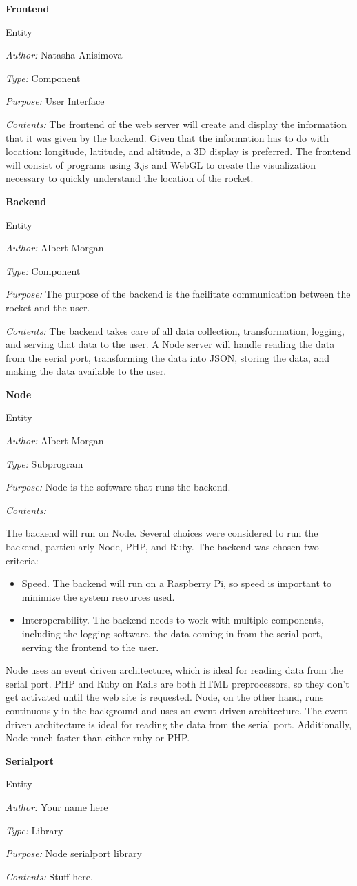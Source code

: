 \documentclass[10pt,draftclsnofoot,onecolumn]{IEEEtran}
\newcommand{\newentity}[5]{
	\begin{minipage}{\linewidth}
	\noindent\textbf{#2}
	
	\noindent Entity
	
	\noindent\textit{Author:} {#1}
		
	\noindent\textit{Type:} {#3}
	
	\noindent\textit{Purpose:} {#4}
	
	\noindent\textit{Contents:} {#5}
	\vspace{.5cm}
	\end{minipage}
}
\begin{document}
	\newentity
	{Natasha Anisimova}
	{Frontend}
	{Component}
	{User Interface}
	{
		The frontend of the web server will create and display the information that it was given by the backend. Given
		that the information has to do with location: longitude, latitude, and altitude, a 3D display is preferred. The
		frontend will consist of programs using 3.js and WebGL to create the visualization necessary to quickly understand the
		location of the rocket.
	}

	\newentity
	{Albert Morgan}
	{Backend}
	{Component}
	{
		The purpose of the backend is the facilitate communication between the rocket and the user.
	}
	{
		The backend takes care of all data collection, transformation, logging, and serving that data to the user.
		A Node server will handle reading the data from the serial port, transforming the data into JSON,
		storing the data, and making the data available to the user.
	}

	\newentity
	{Albert Morgan}
	{Node}
	{Subprogram}
	{Node is the software that runs the backend.}
	{
		The backend will run on Node. Several choices were considered to run the backend, particularly Node, PHP, and Ruby.
		The backend was chosen two criteria:
		\begin{itemize}
			\item Speed. The backend will run on a Raspberry Pi, so speed is important to minimize the system resources used.
			\item Interoperability. The backend needs to work with multiple components, including the logging software, the data coming in from the serial port, serving the frontend to the user.
		\end{itemize}
		Node uses an event driven architecture, which is ideal for reading data from the serial port.
		PHP and Ruby on Rails are both HTML preprocessors, so they don't get activated until the web site is requested.
		Node, on the other hand, runs continuously in the background and uses an event driven architecture.
		The event driven architecture is ideal for reading the data from the serial port.
		Additionally, Node much faster than either ruby or PHP.	
	}

	\newentity
	{Your name here}
	{Serialport}
	{Library}
	{Node serialport library}
	{Stuff here.}
\end{document}
